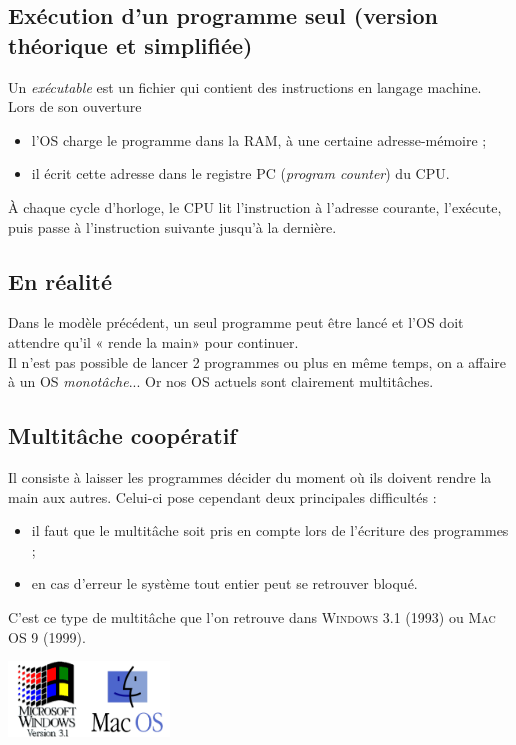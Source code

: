 \documentclass[10pt,firamath,cours]{nsi}
\begin{document}
\subsection{Exécution d'un programme seul (version théorique et simplifiée)}
Un \textit{exécutable} est un fichier qui contient des instructions en langage machine.\\
Lors de son ouverture
\begin{itemize}
	\item l'OS charge le programme dans la RAM, à une certaine adresse-mémoire ;
    \item il écrit cette adresse dans le registre PC (\textit{program counter}) du CPU.
\end{itemize}
À chaque cycle d'horloge, le CPU lit l'instruction à l'adresse courante, l'exécute, puis passe à l'instruction suivante jusqu'à la dernière.


\subsection{En réalité}
Dans le modèle précédent, un seul programme peut être lancé et l'OS doit attendre qu'il « rende la main» pour continuer.\\

Il n'est pas possible de lancer 2 programmes ou plus en même temps, on a affaire à un OS \textit{monotâche}... Or nos OS actuels sont clairement multitâches.

\subsection{Multitâche coopératif}
Il consiste à laisser les programmes décider du moment où ils doivent rendre la main aux autres. Celui-ci pose cependant deux principales difficultés :
\begin{itemize}
	\item il faut que le multitâche soit pris en compte lors de l'écriture des programmes ;
    \item en cas d'erreur le système tout entier peut se retrouver bloqué.
\end{itemize}
C'est ce type de multitâche que l'on retrouve dans \textsc{Windows 3.1} (1993) ou \textsc{Mac OS 9} (1999).\\
\begin{center}
\includegraphics[height=2cm]{img/win31}\hspace{2cm}\includegraphics[height=2cm]{img/macos}
\end{center}
\end{document}
